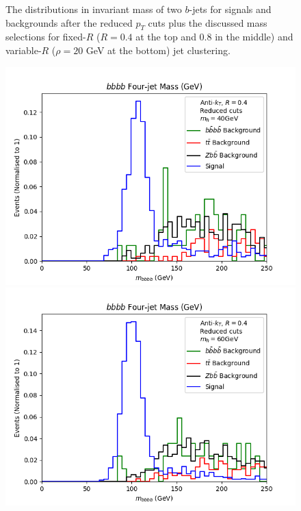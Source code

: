 \documentclass[12pt]{article}
\begin{document}
\begin{figure}[t!]
	\caption{The distributions in invariant mass of two $b$-jets for signals and backgrounds after the reduced $p_T$ cuts plus the discussed mass selections
for fixed-$R$ ($R=0.4$ at the top and 0.8 in the middle) and variable-$R$ ($\rho=20$ GeV at the bottom) jet clustering.}
\label{fig:inv_mass_bkvs_fixedR}
\end{figure}

\clearpage
\thispagestyle{empty}

\begin{figure}[t!]
\hspace*{-0.25cm}
    \includegraphics[scale=0.5]{plots/Background/bbbb_mass_40gev_AK4.png}
    \includegraphics[scale=0.5]{plots/Background/bbbb_mass_60gev_AK4.png}

\end{figure}
\end{document}
